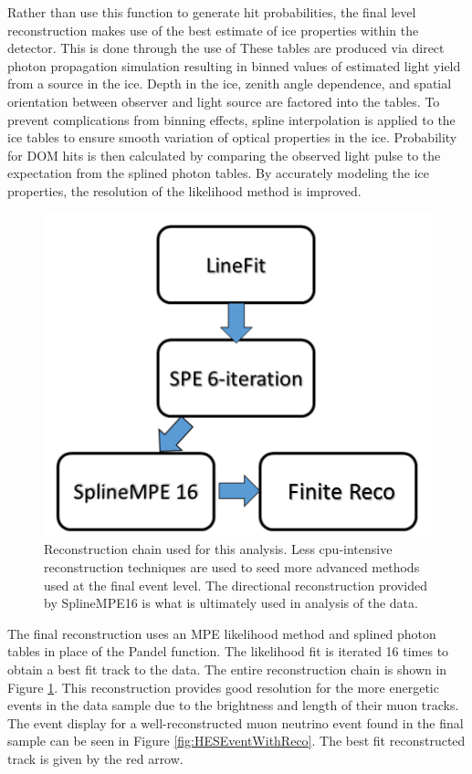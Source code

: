 \documentclass{gatech-thesis}
\begin{document}
Rather than use this function to generate hit probabilities, the final level reconstruction makes use of the best estimate of ice properties within the detector. This is done through the use of These tables are produced via direct photon propagation simulation resulting in binned values of estimated light yield from a source in the ice. Depth in the ice, zenith angle dependence, and spatial orientation between observer and light source are factored into the tables. To prevent complications from binning effects, spline interpolation is applied to the ice tables to ensure smooth variation of optical properties in the ice. Probability for DOM hits is then calculated by comparing the observed light pulse to the expectation from the splined photon tables. By accurately modeling the ice properties, the resolution of the likelihood method is improved.
\begin{figure}[ht]
  \begin{center}
    \includegraphics[width=.45\textwidth,keepaspectratio]{RecoChain.png}
  \end{center}
  \caption{Reconstruction chain used for this analysis. Less cpu-intensive reconstruction techniques are used to seed more advanced methods used at the final event level. The directional reconstruction provided by SplineMPE16 is what is ultimately used in analysis of the data.}
  \label{fig:recochain}
\end{figure}
The final reconstruction uses an MPE likelihood method and splined photon tables in place of the Pandel function. The likelihood fit is iterated 16 times to obtain a best fit track to the data. The entire reconstruction chain is shown in Figure \ref{fig:recochain}. This reconstruction provides good resolution for the more energetic events in the data sample due to the brightness and length of their muon tracks. The event display for a well-reconstructed muon neutrino event found in the final sample can be seen in Figure \ref{fig:HESEventWithReco}. The best fit reconstructed track is given by the red arrow.
\end{document}
